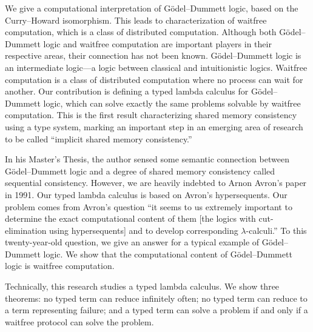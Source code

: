 \begin{eabstract}
 We give a computational interpretation of G\"odel--Dummett logic, based
 on the Curry--Howard isomorphism.  This leads to characterization
 of waitfree computation, which is a class of distributed
 computation.  Although both G\"odel--Dummett logic and waitfree computation are
 important players in their respective areas, their connection has not
 been known.  G\"odel--Dummett logic is an intermediate logic---a
 logic between classical and intuitionistic logics.
 Waitfree computation is a class of distributed computation where no process can
 wait for another.  Our contribution is defining a typed lambda calculus
 for G\"odel--Dummett logic, which can solve
 exactly the same problems solvable by waitfree computation.
 This is the first result characterizing shared memory consistency using
 a type system, marking an important step in
 an emerging area of research to be called ``implicit shared
 memory consistency.''

 In his Master's Thesis, the author sensed some semantic connection
 between G\"odel--Dummett logic and a degree of shared memory consistency
 called sequential consistency.
 However, we are heavily indebted to Arnon
 Avron's paper in 1991.  Our typed lambda calculus is based on Avron's
 hypersequents.
 Our problem comes from Avron's question
 ``it seems to us extremely important to determine the exact
 computational content of them [the logics with cut-elimination
 using hypersequents] and to develop corresponding $\lambda$-calculi.''
 To this twenty-year-old question, we give an answer for a typical
 example of G\"odel--Dummett logic.
 We show that the computational content of G\"odel--Dummett logic is
 waitfree computation.

 Technically, this research studies a typed lambda calculus.
 We show three theorems:
 no typed term can reduce infinitely often;
 no typed term can reduce to a term representing failure;
 and a typed term can solve a problem if and only if a waitfree protocol
 can solve the problem.
\end{eabstract}

